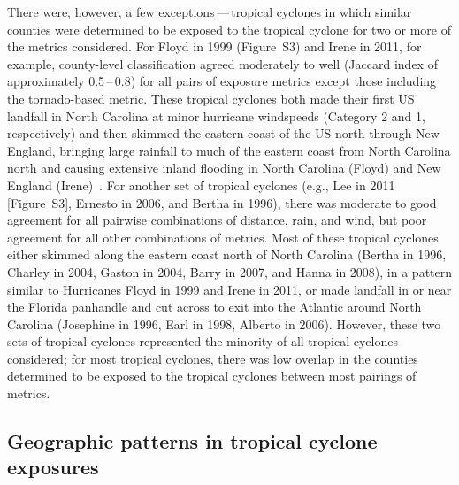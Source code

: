 There were, however, a few exceptions\,---\,tropical cyclones in which similar
counties were determined to be exposed to the tropical cyclone for two or more
of the metrics considered.  For Floyd in 1999 (Figure~S3) and Irene in 2011,
for example, county-level classification agreed moderately to well (Jaccard
index of approximately 0.5\,--\,0.8) for all pairs of exposure metrics except those
including the tornado-based metric. These tropical cyclones both made their
first \ac{US}  landfall in North Carolina at minor hurricane windspeeds (Category
2 and 1, respectively) and then skimmed the eastern coast of the \ac{US} north
through New England, bringing large rainfall to much of the eastern coast from
North Carolina north and causing extensive inland flooding in North Carolina
(Floyd) and New England (Irene)~\citep{avila2013atlantic,
lawrence2000atlantic}. For another set of tropical cyclones (e.g., Lee in 2011
[Figure~S3], Ernesto in 2006, and Bertha in 1996), there was moderate to good
agreement for all pairwise combinations of distance, rain, and wind, but poor
agreement for all other combinations of metrics. Most of these tropical
cyclones either skimmed along the eastern coast north of North Carolina (Bertha
in 1996, Charley in 2004, Gaston in 2004, Barry in 2007, and Hanna in 2008), in
a pattern similar to Hurricanes Floyd in 1999 and Irene in 2011, or made
landfall in or near the Florida panhandle and cut across to exit into the
Atlantic around North Carolina (Josephine in 1996, Earl in 1998, Alberto in
2006). However, these two sets of tropical cyclones represented the minority of
all tropical cyclones considered; for most tropical cyclones, there was low
overlap in the counties determined to be exposed to the tropical cyclones
between most pairings of metrics.

\subsection*{Geographic patterns in tropical cyclone exposures}


